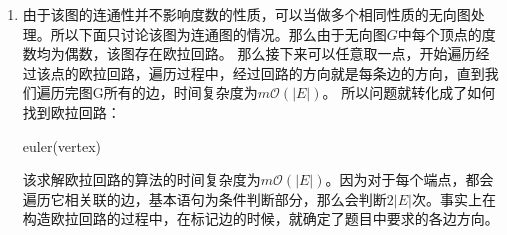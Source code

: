 \documentclass[12pt,a4paper]{article}
\makeatletter
\newtheorem*{solution}{Solution}
\theoremstyle{definition}
\renewenvironment{solution}[1][Solution] {\par\pushQED{\qed}\normalfont\topsep6\p@\@plus6\p@\relax\trivlist\item[\hskip\labelsep\bfseries#1\@addpunct{.}]\ignorespaces}{\popQED\endtrivlist\@endpefalse} \makeatother
\makeatother
\begin{document}
\begin{enumerate}
\begin{solution}
	由于该图的连通性并不影响度数的性质，可以当做多个相同性质的无向图处理。所以下面只讨论该图为连通图的情况。那么由于无向图$G$中每个顶点的度数均为偶数，该图存在欧拉回路。
	那么接下来可以任意取一点，开始遍历经过该点的欧拉回路，遍历过程中，经过回路的方向就是每条边的方向，直到我们遍历完图G所有的边，时间复杂度为$m\mathcal{O}(|E|)$。
	所以问题就转化成了如何找到欧拉回路：
	\begin{algorithm}
		\caption{euler(vertex)}
	\end{algorithm}
	该求解欧拉回路的算法的时间复杂度为$m\mathcal{O}(|E|)$。因为对于每个端点，都会遍历它相关联的边，基本语句为条件判断部分，那么会判断$2|E|$次。事实上在构造欧拉回路的过程中，在标记边的时候，就确定了题目中要求的各边方向。
\end{solution}

\end{enumerate}

\end{document}
